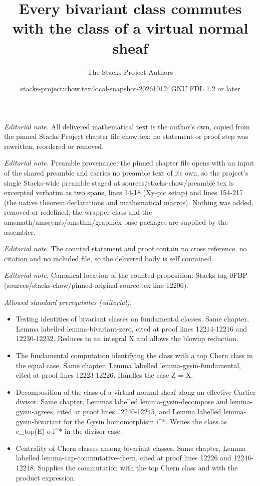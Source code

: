 \documentclass[10pt,a4paper]{amsart}
\title{Every bivariant class commutes with the class of a virtual normal sheaf}
\author{The Stacks Project Authors}
\date{stacks-project:chow.tex:local-snapshot-20261012; GNU FDL 1.2 or later}
\theoremstyle{plain}
\theoremstyle{definition}
\theoremstyle{remark}
\numberwithin{equation}{subsection}
\begin{document}
\maketitle
\noindent\textit{Editorial note.} All delivered mathematical text is the author's own, copied from the pinned Stacks Project chapter file chow.tex; no statement or proof step was rewritten, reordered or removed.\par\medskip
\noindent\textit{Editorial note.} Preamble provenance: the pinned chapter file opens with an input of the shared preamble and carries no preamble text of its own, so the project's single Stacks-wide preamble staged at sources/stacks-chow/preamble.tex is excerpted verbatim as two spans, lines 14-18 (Xy-pic setup) and lines 154-217 (the native theorem declarations and mathematical macros). Nothing was added, removed or redefined; the wrapper class and the amsmath/amssymb/amsthm/graphicx base packages are supplied by the assembler.\par\medskip
\noindent\textit{Editorial note.} The counted statement and proof contain no cross reference, no citation and no included file, so the delivered body is self contained.\par\medskip
\noindent\textit{Editorial note.} Canonical location of the counted proposition: Stacks tag 0FBP (sources/stacks-chow/pinned-original-source.tex line 12206).\par\medskip
\noindent\textit{Allowed standard prerequisites (editorial).}\begin{itemize}
\item Testing identities of bivariant classes on fundamental classes. Same chapter, Lemma labelled lemma-bivariant-zero, cited at proof lines 12214-12216 and 12230-12232. Reduces to an integral X and allows the blowup reduction.
\item The fundamental computation identifying the class with a top Chern class in the equal case. Same chapter, Lemma labelled lemma-gysin-fundamental, cited at proof lines 12223-12226. Handles the case Z = X.
\item Decomposition of the class of a virtual normal sheaf along an effective Cartier divisor. Same chapter, Lemmas labelled lemma-gysin-decompose and lemma-gysin-agrees, cited at proof lines 12240-12245, and Lemma labelled lemma-gysin-bivariant for the Gysin homomorphism i\textasciicircum{}*. Writes the class as c\_top(E) o i\textasciicircum{}* in the divisor case.
\item Centrality of Chern classes among bivariant classes. Same chapter, Lemma labelled lemma-cap-commutative-chern, cited at proof lines 12226 and 12246-12248. Supplies the commutation with the top Chern class and with the product expression.
\end{itemize}\medskip
\end{document}
